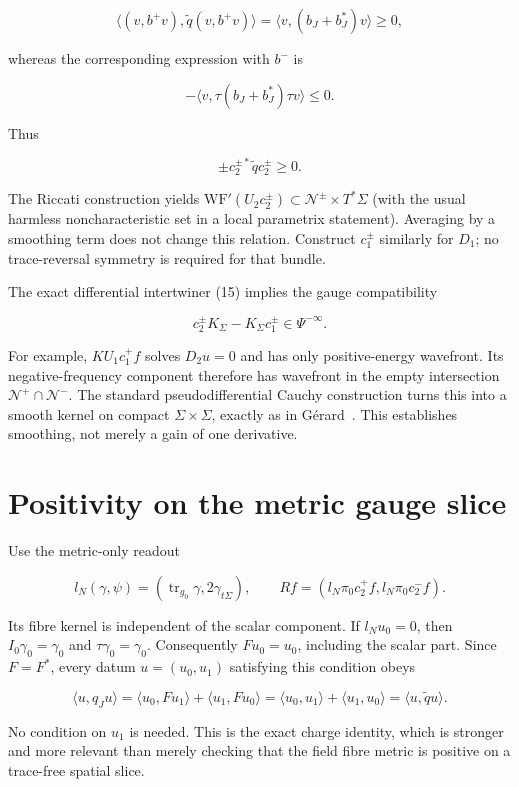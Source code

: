 \[
 \langle(v,b^+v),\widetilde q(v,b^+v)\rangle
 =\langle v,(b_J+b_J^*)v\rangle\ge0,
\]

whereas the corresponding expression with $b^-$ is

\[
 -\langle v,\tau(b_J+b_J^*)\tau v\rangle\le0.
\]

Thus

\[
 \pm c_2^{\pm *}\widetilde q c_2^\pm\ge0.
 \tag{28}
\]

The Riccati construction yields $\mathrm{WF}'(U_2c_2^\pm)\subset\mathcal N^\pm\times T^*\Sigma$ (with the usual harmless noncharacteristic set in a local parametrix statement). Averaging by a smoothing term does not change this relation. Construct $c_1^\pm$ similarly for $D_1$; no trace-reversal symmetry is required for that bundle.

The exact differential intertwiner (15) implies the gauge compatibility

\[
 c_2^\pm K_\Sigma-K_\Sigma c_1^\pm\in\Psi^{-\infty}.
 \tag{29}
\]

For example, $KU_1c_1^+f$ solves $D_2u=0$ and has only positive-energy wavefront. Its negative-frequency component therefore has wavefront in the empty intersection $\mathcal N^+\cap\mathcal N^-$. The standard pseudodifferential Cauchy construction turns this into a smooth kernel on compact $\Sigma\times\Sigma$, exactly as in G\'erard~\cite[Lemma 3.2]{Gerard2024Compact}. This establishes smoothing, not merely a gain of one derivative.

\section{Positivity on the metric gauge slice}

Use the metric-only readout

\[
 l_N(\gamma,\psi)=(\operatorname{tr}_{g_0}\gamma,2\gamma_{t\Sigma}),
 \qquad Rf=(l_N\pi_0c_2^+f,l_N\pi_0c_2^-f).
 \tag{30}
\]

Its fibre kernel is independent of the scalar component. If $l_Nu_0=0$, then $I_0\gamma_0=\gamma_0$ and $\tau\gamma_0=\gamma_0$. Consequently $Fu_0=u_0$, including the scalar part. Since $F=F^*$, every datum $u=(u_0,u_1)$ satisfying this condition obeys

\[
 \langle u,q_Ju\rangle
 =\langle u_0,Fu_1\rangle+\langle u_1,Fu_0\rangle
 =\langle u_0,u_1\rangle+\langle u_1,u_0\rangle
 =\langle u,\widetilde qu\rangle.
 \tag{31}
\]

No condition on $u_1$ is needed. This is the exact charge identity, which is stronger and more relevant than merely checking that the field fibre metric is positive on a trace-free spatial slice.

